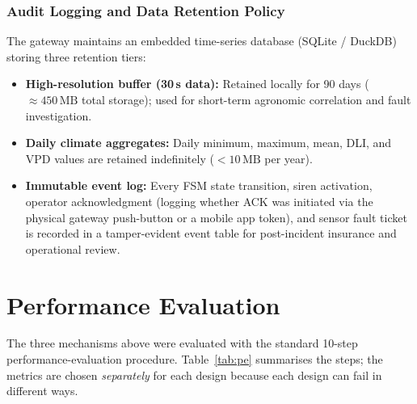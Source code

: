 \documentclass[11pt,a4paper]{report}
\begin{document}
\subsection{Audit Logging and Data Retention Policy}
The gateway maintains an embedded time-series database (SQLite / DuckDB) storing three retention tiers:
\begin{itemize}[noitemsep]
  \item \textbf{High-resolution buffer (30\,s data):} Retained locally for 90 days ($\approx 450\,\text{MB}$ total storage); used for short-term agronomic correlation and fault investigation.
  \item \textbf{Daily climate aggregates:} Daily minimum, maximum, mean, DLI, and VPD values are retained indefinitely ($< 10\,\text{MB}$ per year).
  \item \textbf{Immutable event log:} Every FSM state transition, siren activation, operator acknowledgment (logging whether ACK was initiated via the physical gateway push-button or a mobile app token), and sensor fault ticket is recorded in a tamper-evident event table for post-incident insurance and operational review.
\end{itemize}

\chapter{Performance Evaluation}\label{ch:pe}
The three mechanisms above were evaluated with the standard 10-step performance-evaluation procedure. Table~\ref{tab:pe} summarises the steps; the metrics are chosen \emph{separately} for each design because each design can fail in different ways.
\end{document}
